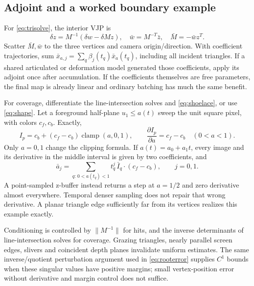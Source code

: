 \documentclass[10pt,letterpaper]{article}
\theoremstyle{remark}\newtheorem{counterexample}[proposition]{Counterexample}
\begin{document}
\subsection{Adjoint and a worked boundary example}
For \eqref{eq:trisolve}, the interior VJP is
\begin{equation}
 \delta z=M^{-1}(\delta w-\delta Mz),\quad
 \bar w=M^{-T}\bar z,\quad \bar M=-\bar w z^T. \label{eq:triadj}
\end{equation}
Scatter $\bar M,\bar w$ to the three vertices and camera origin/direction. With coefficient trajectories, sum $\bar x_{a,j}=\sum_q\beta_j(t_q)\bar x_a(t_q)$, including all incident triangles. If a shared articulated or deformation model generated those coefficients, apply its adjoint once after accumulation. If the coefficients themselves are free parameters, the final map is already linear and ordinary batching has much the same benefit.

For coverage, differentiate the line-intersection solves and \eqref{eq:shoelace}, or use \eqref{eq:shape}. Let a foreground half-plane $u_1\leq a(t)$ sweep the unit square pixel, with colors $c_f,c_b$. Exactly,
\begin{equation}
 I_p=c_b+(c_f-c_b)\operatorname{clamp}(a,0,1),\qquad
 \frac{\partial I_p}{\partial a}=c_f-c_b\quad(0<a<1). \label{eq:edgeexample}
\end{equation}
Only $a=0,1$ change the clipping formula. If $a(t)=a_0+a_1t$, every image and its derivative in the middle interval is given by two coefficients, and
\begin{equation}
 \bar a_j=\sum_{q:\,0<a(t_q)<1}t_q^j\,\bar I_q\cdot(c_f-c_b),\qquad j=0,1.
\end{equation}
A point-sampled z-buffer instead returns a step at $a=1/2$ and zero derivative almost everywhere. Temporal denser sampling does not repair that wrong derivative. A planar triangle edge sufficiently far from its vertices realizes this example exactly.

Conditioning is controlled by $\|M^{-1}\|$ for hits, and the inverse determinants of line-intersection solves for coverage. Grazing triangles, nearly parallel screen edges, slivers and coincident depth planes invalidate uniform estimates. The same inverse/quotient perturbation argument used in \eqref{eq:rooterror} supplies $C^1$ bounds when these singular values have positive margins; small vertex-position error without derivative and margin control does not suffice.
\end{document}
